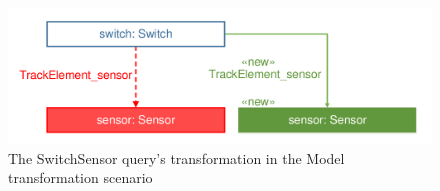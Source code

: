 \begin{figure}[!Htb]
	\centering
	\includegraphics[scale=0.4]{figures/trainbenchmark-transformation-xform-switchsensor}
	\caption{The SwitchSensor query's transformation in the Model transformation scenario}
	\label{fig:trainbenchmark-transformation-xform-switchsensor}
\end{figure}



